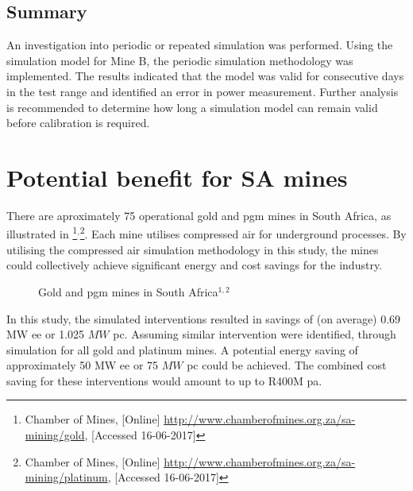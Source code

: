 	\subsection{Summary}
	An investigation into periodic or repeated simulation was performed. Using the simulation model for Mine B, the periodic simulation methodology was implemented. The results indicated that the model was valid for consecutive days in the test range and identified an error in power measurement. Further analysis is recommended to determine how long a simulation model can remain valid before calibration is required.
\section{Potential benefit for SA mines}
There are aproximately 75 operational gold and \gls{pgm} mines in South Africa, as illustrated in  \footnote{ Chamber of Mines, [Online] \url{http://www.chamberofmines.org.za/sa-mining/gold}, [Accessed 16-06-2017]}$^,$\footnote{ Chamber of Mines, [Online] \url{http://www.chamberofmines.org.za/sa-mining/platinum}, [Accessed 16-06-2017]}. Each mine utilises compressed air for underground processes. By utilising the compressed air simulation methodology in this study, the mines could collectively achieve significant energy and cost savings for the industry. 
\par 
	\begin{figure}[h!]
		\centering
		\caption[Gold and Platinum group metal mines in South Africa]{Gold and \gls{pgm} mines in South Africa$^{1,2}$}
		\label{fig: Mine map}
	\end{figure}
In this study, the simulated interventions resulted in savings of (on average) 0.69 MW \gls{ee} or 1.025 $ MW $ \gls{pc}. Assuming similar intervention were identified, through simulation for all gold and platinum mines. A potential energy saving of approximately 50 MW \gls{ee} or 75 $ MW $ \gls{pc} could be achieved. The combined cost saving for these interventions would amount to up to R400M \gls{pa}.
\clearpage
